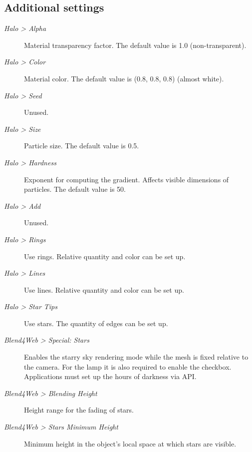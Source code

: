 \documentclass[a4paper,12pt,oneside]{sphinxmanual}
\begin{document}
\subsection{Additional settings}
\label{materials:id15}\begin{description}
\item[{\emph{Halo \textgreater{} Alpha}}] \leavevmode
Material transparency factor. The default value is 1.0 (non-transparent).

\item[{\emph{Halo \textgreater{} Color}}] \leavevmode
Material color. The default value is (0.8, 0.8, 0.8) (almost white).

\item[{\emph{Halo \textgreater{} Seed}}] \leavevmode
Unused.

\item[{\emph{Halo \textgreater{} Size}}] \leavevmode
Particle size. The default value is 0.5.

\item[{\emph{Halo \textgreater{} Hardness}}] \leavevmode
Exponent for computing the gradient. Affects visible dimensions of particles. The default value is 50.

\item[{\emph{Halo \textgreater{} Add}}] \leavevmode
Unused.

\item[{\emph{Halo \textgreater{} Rings}}] \leavevmode
Use rings. Relative quantity and color can be set up.

\item[{\emph{Halo \textgreater{} Lines}}] \leavevmode
Use lines. Relative quantity and color can be set up.

\item[{\emph{Halo \textgreater{} Star Tips}}] \leavevmode
Use stars. The quantity of edges can be set up.

\item[{\emph{Blend4Web \textgreater{} Special: Stars}}] \leavevmode
Enables the starry sky rendering mode while the mesh is fixed relative to the camera. For the lamp it is also required to enable the  checkbox. Applications must set up the hours of darkness via API.

\item[{\emph{Blend4Web \textgreater{} Blending Height}}] \leavevmode
Height range for the fading of stars.

\item[{\emph{Blend4Web \textgreater{} Stars Minimum Height}}] \leavevmode
Minimum height in the object's local space at which stars are visible.

\end{description}
\label{node_materials:node-materials}
\end{document}

